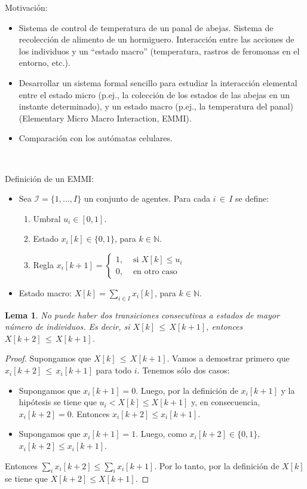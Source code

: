 \documentclass{article}
\newtheorem{lema}{Lema}
\begin{document}
Motivación: 
\begin{itemize}
\item Sistema de control de temperatura de un panal de abejas. Sistema de recolección de alimento de un hormiguero. Interacción entre las acciones de los individuos y un ``estado macro'' (temperatura, rastros de feromonas en el entorno, etc.).
\item Desarrollar un sistema formal sencillo para  estudiar la interacción elemental entre el estado micro (p.ej., la colección de los estados de las abejas en un instante determinado), y un estado macro (p.ej., la temperatura del panal) (Elementary Micro Macro Interaction, EMMI). 
\item Comparación con los autómatas celulares.
\end{itemize}

\

Definición de un EMMI:
\begin{itemize}
\item Sea $\mathcal{I}=\{1,\ldots,I\}$ un conjunto de agentes. Para cada $i\,{\in}\,I$ se define:
	\begin{enumerate}
	\item Umbral $u_i\in[0,1]$.
	\item Estado $x_i[k]\in\{0, 1\}$, para $k\in\mathbb{N}$.
	\item Regla  $x_i[k+1]=\begin{cases} 1, & \mbox{ si }X[k]\leq u_i\\ 0, & \mbox{ en otro caso }\end{cases}$
	\end{enumerate}

\item Estado macro: $X[k]=\sum_{i\in I} x_i[k]$, para $k\in\mathbb{N}$.
\end{itemize}

\begin{lema}
No puede haber dos transiciones consecutivas a estados de mayor número de individuos. Es decir, si $X[k]\,{\leq}\,X[k{+}1]$, entonces $X[k{+}2]\,{\leq}\, X[k{+}1]$.
\end{lema}
\begin{proof}
Supongamos que $X[k]\,{\leq}\,X[k{+}1]$. Vamos a demostrar primero que $x_i[k{+}2]\,{\leq}\, x_i[k{+}1]$ para todo $i$. Tenemos sólo dos casos:

\begin{itemize}
\item Supongamos que $x_i[k{+}1]=0$. Luego, por la definición de $x_i[k{+}1]$ y la hipótesis se tiene que $u_i<X[k]\leq X[k{+}1]$ y, en consecuencia, $x_i[k{+}2]=0$. Entonces $x_i[k{+}2]\leq x_i[k{+}1]$.
\item Supongamos que $x_i[k{+}1]=1$. Luego, como $x_i[k{+}2]\in\{0,1\}$, $x_i[k{+}2]\leq x_i[k{+}1]$.
\end{itemize}

Entonces $\sum_i x_i[k{+}2]\leq \sum_i x_i[k{+}1]$. Por lo tanto, por la definición de $X[k]$ se tiene que $X[k{+}2]\leq X[k{+}1]$.
\end{proof}
\end{document}
